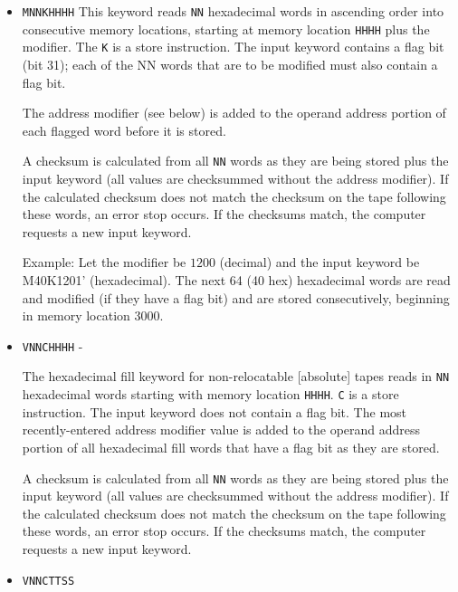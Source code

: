 \begin{itemize}
\item \texttt{MNNKHHHH}
\label{sec:hexadecimal-fill}
This keyword reads \texttt{NN} hexadecimal words in ascending order into consecutive memory locations, starting at memory location \texttt{HHHH} plus the modifier. The \texttt{K} is a store instruction. The input keyword contains a flag bit (bit 31); 
each of the NN words that are to be modified must also contain a flag bit.


The address modifier (see below) is added to the operand address portion of each flagged word before it is stored.

A checksum is calculated from all \texttt{NN} words as they are being stored plus the input keyword (all values are checksummed without the address modifier). If the calculated checksum does not match the checksum on the tape following these words, an error stop occurs. If the checksums match, the computer requests a new input keyword.

Example: Let the modifier be $1200$ (decimal) and the input keyword be M40K1201' (hexadecimal). The next 64 (40 hex) hexadecimal words are read and modified (if they have a flag bit) and are stored consecutively, beginning in memory location $3000$.

\item \texttt{VNNCHHHH} - 

The hexadecimal fill keyword for non-relocatable [absolute] tapes reads in \texttt{NN} hexadecimal words starting with memory location \texttt{HHHH}. \texttt{C} is a store instruction. The input keyword does not contain a flag bit. The most recently-entered address modifier value is added to the operand address portion of all hexadecimal fill words that have a flag bit as they are stored.

A checksum is calculated from all \texttt{NN} words as they are being stored plus the input keyword (all values are checksummed without the address modifier). If the calculated checksum does not match the checksum on the tape following these words, an error stop occurs. If the checksums match, the computer requests a new input keyword.


\item \texttt{VNNCTTSS} 


\end{itemize}
